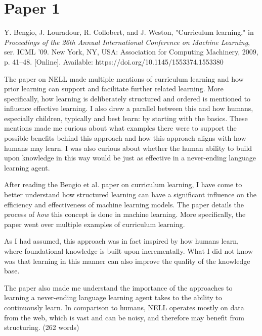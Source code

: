 \documentclass[12pt, letterpaper]{article}
\begin{document}
\pagestyle{empty}
\singlespacing
\vspace{1.0cm}

\newgeometry{} %


\section{Paper 1}
\label{sec:Paper 1}
Y. Bengio, J. Louradour, R. Collobert, and J. Weston, "Curriculum learning," in \emph{Proceedings of the 26th Annual International Conference on Machine Learning}, ser. ICML '09. New York, NY, USA: Association for Computing Machinery, 2009, p. 41–48. [Online]. Available: https://doi.org/10.1145/1553374.1553380

The paper on NELL made multiple mentions of curriculum learning and how prior learning can support and facilitate further related learning. More specifically, how learning is deliberately structured and ordered is mentioned to influence effective learning. I also drew a parallel between this and how humans, especially children, typically and best learn: by starting with the basics. These mentions made me curious about what examples there were to support the possible benefits behind this approach and how this approach aligns with how humans may learn. I was also curious about whether the human ability to build upon knowledge in this way would be just as effective in a never-ending language learning agent.

After reading the Bengio et al. paper on curriculum learning, I have come to better understand how structured learning can have a significant influence on the efficiency and effectiveness of machine learning models. The paper details the process of \emph{how} this concept is done in machine learning. More specifically, the paper went over multiple examples of curriculum learning.

As I had assumed, this approach was in fact inspired by how humans learn, where foundational knowledge is built upon incrementally. What I did not know was that learning in this manner can also improve the quality of the knowledge base.

The paper also made me understand the importance of the approaches to learning a never-ending language learning agent takes to the ability to continuously learn. In comparison to humans, NELL operates mostly on data from the web, which is vast and can be noisy, and therefore may benefit from structuring. (262 words)
\end{document}
